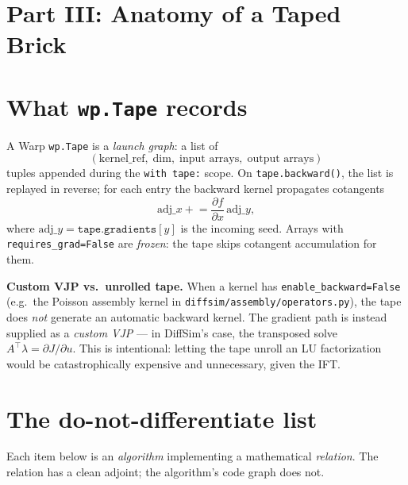 \documentclass[11pt]{article}
\begin{document}
\section*{Part III: Anatomy of a Taped Brick}

\section{What \texttt{wp.Tape} records}
\label{sec:tape}

A Warp \texttt{wp.Tape} is a \emph{launch graph}: a list of
\[
  (\text{kernel\_ref},\; \text{dim},\; \text{input arrays},\;
   \text{output arrays})
\]
tuples appended during the \texttt{with tape:} scope.  On
\texttt{tape.backward()}, the list is replayed in reverse; for each entry
the backward kernel propagates cotangents
\[
  \mathrm{adj}\_x \mathrel{+}= \frac{\partial f}{\partial x}\,
  \mathrm{adj}\_y,
\]
where $\mathrm{adj}\_y = \texttt{tape.gradients}[y]$ is the incoming seed.
Arrays with \texttt{requires\_grad=False} are \emph{frozen}: the tape
skips cotangent accumulation for them.

\textbf{Custom VJP vs.\ unrolled tape.}  When a kernel has
\texttt{enable\_backward=False} (e.g.\ the Poisson assembly kernel in
\texttt{diffsim/assembly/}\allowbreak\texttt{operators.py}), the tape
does \emph{not} generate an automatic backward kernel.  The gradient path
is instead supplied as a \emph{custom VJP} --- in DiffSim's case, the
transposed solve $A^\top \lambda = \partial J/\partial u$.  This is
intentional: letting the tape unroll an LU factorization would be
catastrophically expensive and unnecessary, given the IFT.

\section{The do-not-differentiate list}
\label{sec:dontdiff}

Each item below is an \emph{algorithm} implementing a mathematical
\emph{relation}.  The relation has a clean adjoint; the algorithm's
code graph does not.
\end{document}
